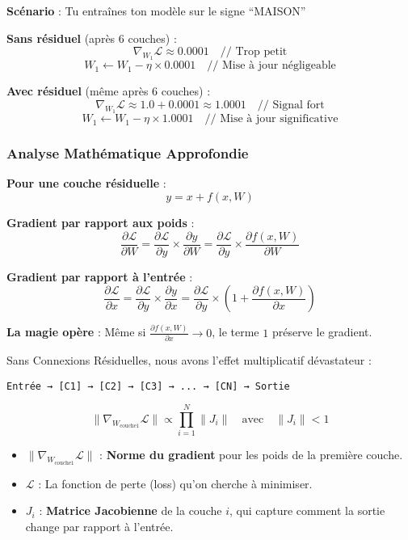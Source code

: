 \documentclass[12pt]{article}
\providecommand{\tightlist}{%
      \setlength{\itemsep}{0pt}\setlength{\parskip}{0pt}}
\begin{document}
\textbf{Scénario} : Tu entraînes ton modèle sur le signe ``MAISON''

\textbf{Sans résiduel} (après 6 couches) :
\[ \nabla_{W_1} \mathcal{L} \approx 0.0001 \quad \text{// Trop petit} \]
\[ W_1 \leftarrow W_1 - \eta \times 0.0001 \quad \text{// Mise à jour négligeable} \]

\textbf{Avec résiduel} (même après 6 couches) :
\[ \nabla_{W_1} \mathcal{L} \approx 1.0 + 0.0001 \approx 1.0001 \quad \text{// Signal fort} \]
\[ W_1 \leftarrow W_1 - \eta \times 1.0001 \quad \text{// Mise à jour significative} \]

    \subsubsection{\texorpdfstring{\textbf{Analyse Mathématique
Approfondie}}{Analyse Mathématique Approfondie}}\label{analyse-mathuxe9matique-approfondie}

\textbf{Pour une couche résiduelle} : \[ y = x + f(x, W) \]

\textbf{Gradient par rapport aux poids} :
\[ \frac{\partial \mathcal{L}}{\partial W} = \frac{\partial \mathcal{L}}{\partial y} \times \frac{\partial y}{\partial W} = \frac{\partial \mathcal{L}}{\partial y} \times \frac{\partial f(x, W)}{\partial W} \]

\textbf{Gradient par rapport à l'entrée} :
\[ \frac{\partial \mathcal{L}}{\partial x} = \frac{\partial \mathcal{L}}{\partial y} \times \frac{\partial y}{\partial x} = \frac{\partial \mathcal{L}}{\partial y} \times \left(1 + \frac{\partial f(x, W)}{\partial x}\right) \]

\textbf{La magie opère} : Même si
\(\frac{\partial f(x, W)}{\partial x} \to 0\), le terme \(1\) préserve
le gradient.

Sans Connexions Résiduelles, nous avons l'effet multiplicatif
dévastateur :

\begin{verbatim}
Entrée → [C1] → [C2] → [C3] → ... → [CN] → Sortie
\end{verbatim}

\[\|\nabla_{W_{\text{couche1}}} \mathcal{L}\| \propto \prod_{i=1}^{N} \|J_i\| \quad \text{avec} \quad \|J_i\| < 1\]

\begin{itemize}
\tightlist
\item
  \(\|\nabla_{W_{\text{couche1}}} \mathcal{L}\|\) : \textbf{Norme du
  gradient} pour les poids de la première couche.
\item
  \(\mathcal{L}\) : La fonction de perte (loss) qu'on cherche à
  minimiser.
\item
  \(J_i\) : \textbf{Matrice Jacobienne} de la couche \(i\), qui capture
  comment la sortie change par rapport à l'entrée.
\end{itemize}
\end{document}
